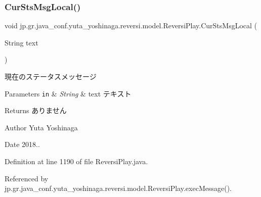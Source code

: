 \subsubsection{\texorpdfstring{Cur\+Sts\+Msg\+Local()}{CurStsMsgLocal()}}
{\footnotesize\ttfamily void jp.\+gr.\+java\+\_\+conf.\+yuta\+\_\+yoshinaga.\+reversi.\+model.\+Reversi\+Play.\+Cur\+Sts\+Msg\+Local (\begin{DoxyParamCaption}\item[{String}]{text }\end{DoxyParamCaption})\hspace{0.3cm}{\ttfamily [private]}}



現在のステータスメッセージ 


\begin{DoxyParams}[1]{Parameters}
\mbox{\tt in}  & {\em String} & text テキスト \\
\hline
\end{DoxyParams}
\begin{DoxyReturn}{Returns}
ありません 
\end{DoxyReturn}
\begin{DoxyAuthor}{Author}
Yuta Yoshinaga 
\end{DoxyAuthor}
\begin{DoxyDate}{Date}
2018.. 
\end{DoxyDate}


Definition at line 1190 of file Reversi\+Play.\+java.



Referenced by jp.\+gr.\+java\+\_\+conf.\+yuta\+\_\+yoshinaga.\+reversi.\+model.\+Reversi\+Play.\+exec\+Message().

